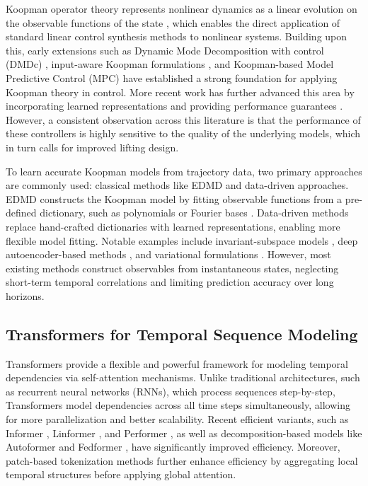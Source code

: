 \documentclass[journal]{IEEEtran}
\begin{document}
Koopman operator theory represents nonlinear dynamics as a linear evolution on the observable functions of the state \cite{koopman1931hamiltonian, koopman1932spectra, mezic2005spectral}, which enables the direct application of standard linear control synthesis methods to nonlinear systems. Building upon this, early extensions such as Dynamic Mode Decomposition with control (DMDc) \cite{proctor2016dmdc}, input-aware Koopman formulations \cite{proctor2018generalizing, brunton2016invariant}, and Koopman-based Model Predictive Control (MPC) \cite{korda2018linear} have established a strong foundation for applying Koopman theory in control. More recent work has further advanced this area by incorporating learned representations and providing performance guarantees \cite{han2020deep, shi2022deep, strasser2026overview, duran2025control}. However, a consistent observation across this literature is that the performance of these controllers is highly sensitive to the quality of the underlying models, which in turn calls for improved lifting design. 

To learn accurate Koopman models from trajectory data, two primary approaches are commonly used: classical methods like EDMD and data-driven approaches. EDMD constructs the Koopman model by fitting observable functions from a pre-defined dictionary, such as polynomials or Fourier bases \cite{williams2015data, williams2015kernel, klus2018data}. Data-driven methods replace hand-crafted dictionaries with learned representations, enabling more flexible model fitting. Notable examples include invariant-subspace models \cite{takeishi2017koopman}, deep autoencoder-based methods \cite{lusch2018deep, yeung2019learning}, and variational formulations \cite{morton2019deep, yuan2022variational}. However, most existing methods construct observables from instantaneous states, neglecting short-term temporal correlations and limiting prediction accuracy over long horizons.


\subsection{Transformers for Temporal Sequence Modeling}

Transformers \cite{vaswani2017attention} provide a flexible and powerful framework for modeling temporal dependencies via self-attention mechanisms. Unlike traditional architectures, such as recurrent neural networks (RNNs), which process sequences step-by-step, Transformers model dependencies across all time steps simultaneously, allowing for more parallelization and better scalability. Recent efficient variants, such as Informer \cite{zhou2021informer}, Linformer \cite{wang2020linformer}, and Performer \cite{choromanski2021performer}, as well as decomposition-based models like Autoformer \cite{wu2021autoformer} and Fedformer \cite{zhou2022fedformer}, have significantly improved efficiency. Moreover, patch-based tokenization methods \cite{nie2023time} further enhance efficiency by aggregating local temporal structures before applying global attention.
\end{document}
